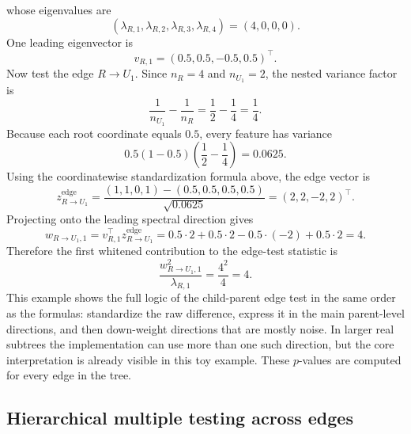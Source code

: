 whose eigenvalues are
\begin{equation}
(\lambda_{R,1},\lambda_{R,2},\lambda_{R,3},\lambda_{R,4}) = (4,0,0,0).
\end{equation}
One leading eigenvector is
\begin{equation}
v_{R,1} = (0.5,0.5,-0.5,0.5)^\top.
\end{equation}
Now test the edge $R \to U_1$. Since $n_R=4$ and $n_{U_1}=2$, the nested
variance factor is
\begin{equation}
\frac{1}{n_{U_1}} - \frac{1}{n_R} = \frac{1}{2} - \frac{1}{4} = \frac{1}{4}.
\end{equation}
Because each root coordinate equals $0.5$, every feature has variance
\begin{equation}
0.5(1-0.5)\left(\frac{1}{2}-\frac{1}{4}\right)=0.0625.
\end{equation}
Using the coordinatewise standardization formula above, the edge vector is
\begin{equation}
z_{R \to U_1}^{\mathrm{edge}}
=
\frac{(1,1,0,1)-(0.5,0.5,0.5,0.5)}{\sqrt{0.0625}}
=
(2,2,-2,2)^\top.
\end{equation}
Projecting onto the leading spectral direction gives
\begin{equation}
w_{R \to U_1,1}
=
v_{R,1}^\top z_{R \to U_1}^{\mathrm{edge}}
=
0.5\cdot 2 + 0.5\cdot 2 - 0.5\cdot (-2) + 0.5\cdot 2
=
4.
\end{equation}
Therefore the first whitened contribution to the edge-test statistic is
\begin{equation}
\frac{w_{R \to U_1,1}^2}{\lambda_{R,1}}
=
\frac{4^2}{4}
=
4.
\end{equation}
This example shows the full logic of the child-parent edge test in the same
order as the formulas: standardize the raw difference, express it in the main
parent-level directions, and then down-weight directions that are mostly noise.
In larger real subtrees the implementation can use more than one such
direction, but the core interpretation is already visible in this toy example.
These $p$-values are computed for every edge in the tree.

\subsection{Hierarchical multiple testing across edges}

